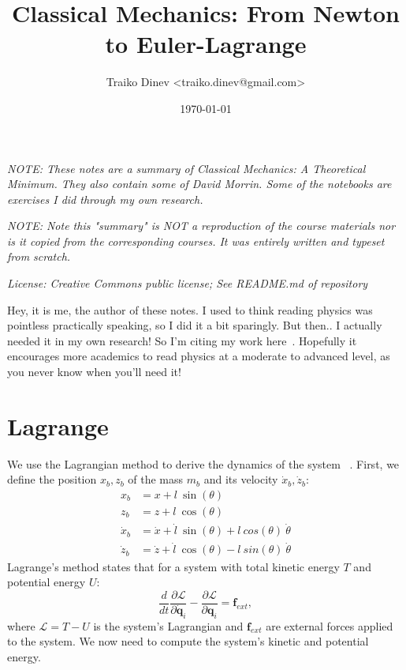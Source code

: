 \documentclass{article}
\title{Classical Mechanics: From Newton to Euler-Lagrange}
\date{\today}
\author{Traiko Dinev \textless traiko.dinev@gmail.com\textgreater}
\newcommand{\vq}{\mathbf{q}}
\newcommand{\vqdot}{\mathbf{\dot{q}}}
\newcommand{\vf}{\mathbf{f}}
\begin{document}
\maketitle
\textit{NOTE: These notes are a summary of Classical Mechanics: A Theoretical Minimum. They also contain some of David Morrin. Some of the notebooks are exercises I did through my own research.}

\textit{NOTE: Note this "summary" is NOT a reproduction of the course materials nor is it copied from the corresponding courses. It was entirely written and typeset from scratch.}

\textit{License: Creative Commons public license; See README.md of repository}

Hey, it is me, the author of these notes. I used to think reading physics was pointless practically speaking, so I did it a bit sparingly. But then.. I actually needed it in my own research! So I'm citing my work here~\cite{dinev2020modeling}. Hopefully it encourages more academics to read physics at a moderate to advanced level, as you never know when you'll need it!


\section{Lagrange}

We use the Lagrangian method to derive the dynamics of the system ~\cite[Chapter~6]{morin_introduction_2008}. 
First, we define the position $x_b, z_b$ of the mass $m_b$ and its velocity $\dot{x}_b, \dot{z}_b$:
% 
\begin{align}
    x_b &= x + l\ \sin(\theta) \\
    z_b &= z + l\ \cos(\theta) \nonumber \\
    \dot{x}_b &= \dot{x} + \dot{l}\ \sin(\theta) +
        l\ cos(\theta)\ \dot{\theta} \nonumber \\
    \dot{z}_b &= \dot{z} + \dot{l}\ \cos(\theta) -
        l\ sin(\theta)\ \dot{\theta} \nonumber
\end{align}
% 
Lagrange's method states that for a system with total kinetic energy $T$ and potential energy $U$:
% 
\vskip 0.1in
\begin{equation} \label{eq:lagrange}
    \frac{d}{dt} \frac{\partial \mathcal{L}}{\partial \vqdot_i} - \frac{\partial \mathcal{L}}{\partial \vq_i} = \vf_{ext},
\end{equation}
\vskip 0.1in
% 
where $\mathcal{L} = T - U$ is the system's Lagrangian and $\vf_{ext}$ are external forces applied to the system. We now need to compute the system's kinetic and potential energy.
\end{document}
